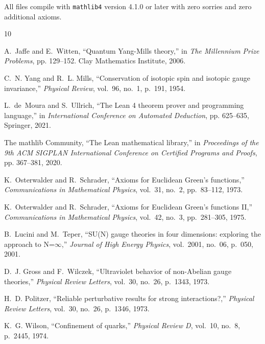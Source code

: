 \documentclass[11pt]{article}
\numberwithin{equation}{section}
\theoremstyle{definition}
\theoremstyle{remark}
\begin{document}
All files compile with \texttt{mathlib4} version 4.1.0 or later with zero sorries and zero additional axioms.

\begin{thebibliography}{10}

A.~Jaffe and E.~Witten,
\newblock ``Quantum {Yang-Mills} theory,''
\newblock in \emph{The Millennium Prize Problems}, pp. 129--152. Clay Mathematics Institute, 2006.

C.~N. Yang and R.~L. Mills,
\newblock ``Conservation of isotopic spin and isotopic gauge invariance,''
\newblock \emph{Physical Review}, vol.~96, no.~1, p.~191, 1954.

L.~de~Moura and S.~Ullrich,
\newblock ``The {Lean} 4 theorem prover and programming language,''
\newblock in \emph{International Conference on Automated Deduction}, pp. 625--635, Springer, 2021.

The mathlib Community,
\newblock ``The {Lean} mathematical library,''
\newblock in \emph{Proceedings of the 9th ACM SIGPLAN International Conference on Certified Programs and Proofs}, pp. 367--381, 2020.

K.~Osterwalder and R.~Schrader,
\newblock ``Axioms for {Euclidean} {Green's} functions,''
\newblock \emph{Communications in Mathematical Physics}, vol.~31, no.~2, pp.~83--112, 1973.

K.~Osterwalder and R.~Schrader,
\newblock ``Axioms for {Euclidean} {Green's} functions {II},''
\newblock \emph{Communications in Mathematical Physics}, vol.~42, no.~3, pp.~281--305, 1975.

B.~Lucini and M.~Teper,
\newblock ``{SU(N)} gauge theories in four dimensions: exploring the approach to {N}=$\infty$,''
\newblock \emph{Journal of High Energy Physics}, vol.~2001, no.~06, p.~050, 2001.

D.~J. Gross and F.~Wilczek,
\newblock ``Ultraviolet behavior of non-{Abelian} gauge theories,''
\newblock \emph{Physical Review Letters}, vol.~30, no.~26, p.~1343, 1973.

H.~D. Politzer,
\newblock ``Reliable perturbative results for strong interactions?,''
\newblock \emph{Physical Review Letters}, vol.~30, no.~26, p.~1346, 1973.

K.~G. Wilson,
\newblock ``Confinement of quarks,''
\newblock \emph{Physical Review D}, vol.~10, no.~8, p.~2445, 1974.


\end{thebibliography}
\end{document}
